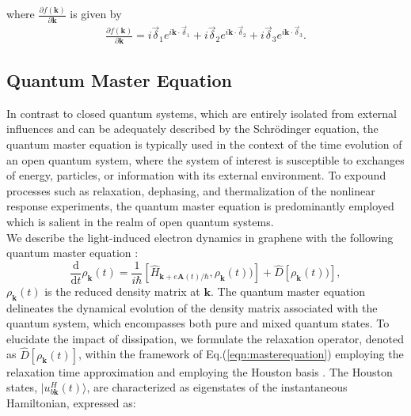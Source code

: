 where $\frac{\partial f(\mathbf k)}{\partial \mathbf k}$ is given by 
\begin{align}
\frac{\partial f(\mathbf k)}{\partial \mathbf k}=i \overrightarrow{\delta}_1e^{i\mathbf k \cdot \overrightarrow\delta_1}
+i \overrightarrow{\delta}_2e^{i\mathbf k \cdot \vec \delta_2}
+i \overrightarrow{\delta}_3e^{i\mathbf k \cdot \overrightarrow\delta_3}.
\end{align}
\subsection{Quantum Master Equation \label{sec:master}}
In contrast to closed quantum systems, which are entirely isolated from external influences and can be adequately described by the Schrödinger equation, the quantum master equation is typically used in the context of the time evolution of an open quantum system, where the system of interest is susceptible to exchanges of energy, particles, or information with its external environment. 
To expound processes such as relaxation, dephasing, and thermalization of the nonlinear response experiments, the quantum master equation is predominantly employed which is salient in the realm of open quantum systems.\\
We describe the light-induced electron dynamics in graphene with the following quantum master equation \cite{sato2019light,sato2019microscopic,sato2021high,sato2021nonlinear}:
\begin{equation}
\frac{\mathrm{d}}{\mathrm{d}t}\rho_{\mathbf{k}}(t) = \frac{1}{i \hbar}	\left[ \hat{H}_{\mathbf{k}+e\mathbf{A}(t)/\hbar}, \rho_{\mathbf{k}} (t)) \right] + 	
\hat{D}\left[ \rho_{\mathbf{k}} (t)) \right],
\label{eqn:masterequation}
\end{equation}
$\rho_{\mathbf k}(t)$ is the reduced density matrix at $\mathbf k$. The quantum master equation delineates the dynamical evolution of the density matrix associated with the quantum system, which encompasses both pure and mixed quantum states. 
To elucidate the impact of dissipation, we formulate the relaxation operator, denoted as
$\hat{D}\left[\rho_{\mathbf{k}} (t)\right]$, within the framework of Eq.(\ref{eqn:masterequation})
employing the relaxation time approximation\cite{meier1994coherent} and employing the Houston basis
\cite{PhysRev.57.184, PhysRevB.33.5494}. The Houston states, $|u^H_{b\mathbf k}(t)\rangle $,  are characterized as eigenstates of the instantaneous Hamiltonian, expressed as:
